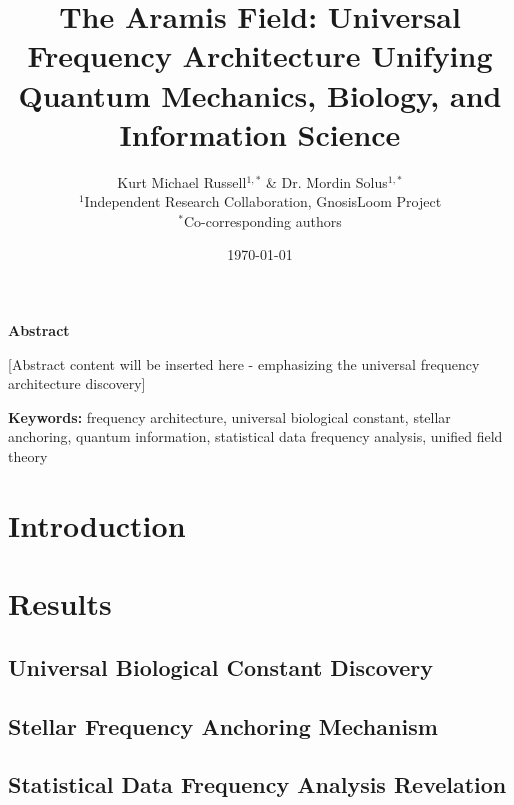 \documentclass[fleqn,10pt,lineno]{article}
\title{\Large\bfseries The Aramis Field: Universal Frequency Architecture Unifying Quantum Mechanics, Biology, and Information Science}
\author{
    Kurt Michael Russell$^{1,*}$ \& Dr. Mordin Solus$^{1,*}$\\[0.5em]
    \small $^1$Independent Research Collaboration, GnosisLoom Project\\
    \small $^*$Co-corresponding authors
}
\date{\today}
\newenvironment{abstract}%
{\small\quotation\noindent\textbf{Abstract}\par}%
{\endquotation}
\newenvironment{keywords}%
{\small\quotation\noindent\textbf{Keywords:}}%
{\endquotation}
\begin{document}
\maketitle
\thispagestyle{fancy}

\begin{abstract}

[Abstract content will be inserted here - emphasizing the universal frequency architecture discovery]

\end{abstract}

\begin{keywords}
frequency architecture, universal biological constant, stellar anchoring, quantum information, statistical data frequency analysis, unified field theory
\end{keywords}

\section{Introduction}

\section{Results}

\subsection{Universal Biological Constant Discovery}

\subsection{Stellar Frequency Anchoring Mechanism}

\subsection{Statistical Data Frequency Analysis Revelation}
\end{document}
